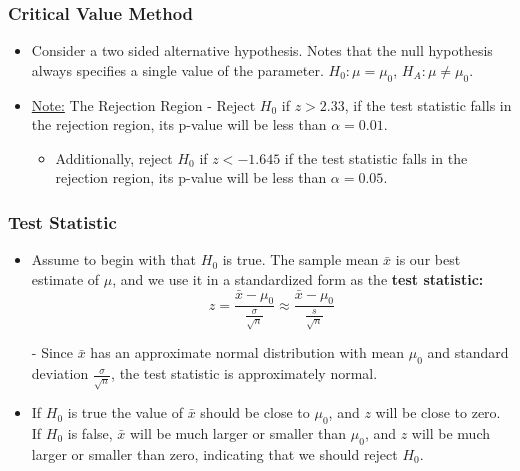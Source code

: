 \documentclass[12pt, letterpaper]{article}
\begin{document}
            \subsubsection{Critical Value Method}
                \begin{itemize}
                    \item Consider a two sided alternative hypothesis. Notes that the null hypothesis always specifies a single value of the parameter. $H_0 : \mu = \mu_0$, $H_A : \mu \neq \mu_0$.
                    \item \underline{Note:} The Rejection Region - Reject $H_0$ if $z > 2.33$, if the test statistic falls in the rejection region, its p-value will be less than $\alpha = 0.01$.
                    \begin{itemize}
                        \item Additionally, reject $H_0$ if $z < -1.645$ if the test statistic falls in the rejection region, its p-value will be less than $\alpha = 0.05$.
                    \end{itemize}
                \end{itemize}
            \subsubsection*{Test Statistic}
                \begin{itemize}
                    \item Assume to begin with that $H_0$ is true. The sample mean $\bar{x}$ is our best estimate of $\mu$, and we use it in a standardized form as the \textbf{test statistic:}
                    \begin{equation*}
                        z = \frac{\bar{x}-\mu_0}{\frac{\sigma}{\sqrt{n}}} \approx \frac{\bar{x}-\mu_0}{\frac{s}{\sqrt{n}}}
                    \end{equation*}
                    \item[-] Since $\bar{x}$ has an approximate normal distribution with mean $\mu_0$ and standard deviation $\frac{\sigma}{\sqrt{n}}$, the test statistic is approximately normal.
                    \item If $H_0$ is true the value of $\bar{x}$ should be close to $\mu_0$, and $z$ will be close to zero. If $H_0$ is false, $\bar{x}$ will be much larger or smaller than $\mu_0$, and $z$ will be much larger or smaller than zero, indicating that we should reject $H_0$.
                \end{itemize}
\end{document}
